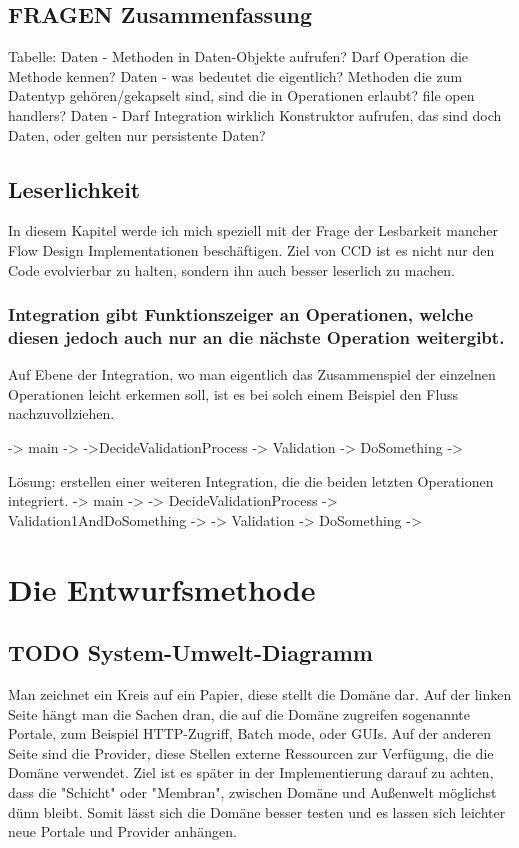 \documentclass[a4paper,12pt,oneside]{book}
\begin{document}
\section{FRAGEN Zusammenfassung}
\label{sec-4-8}

Tabelle:
Daten - Methoden in Daten-Objekte aufrufen? Darf Operation die Methode kennen?
Daten - was bedeutet die eigentlich? Methoden die zum Datentyp
gehören/gekapselt sind, sind die in Operationen erlaubt? file open handlers?
Daten - Darf Integration wirklich Konstruktor aufrufen, das sind doch Daten, oder gelten nur persistente Daten?



\section{Leserlichkeit}
\label{sec-4-9}
In diesem Kapitel werde ich mich speziell mit der Frage der Lesbarkeit mancher Flow Design Implementationen beschäftigen.
Ziel von CCD ist es nicht nur den Code evolvierbar zu halten, sondern ihn auch besser leserlich zu machen.

\subsection{Integration gibt Funktionszeiger an Operationen, welche diesen jedoch auch nur an die nächste Operation weitergibt.}
\label{sec-4-9-1}
Auf Ebene der Integration, wo man eigentlich das Zusammenspiel der einzelnen Operationen leicht erkennen soll, ist es bei solch einem Beispiel den
Fluss nachzuvollziehen.

-> main ->
->DecideValidationProcess -> Validation -> DoSomething ->

Lösung: erstellen einer weiteren Integration, die die beiden letzten Operationen integriert.
-> main ->
-> DecideValidationProcess -> Validation1AndDoSomething ->
                          -> Validation -> DoSomething ->


\chapter{Die Entwurfsmethode}
\label{sec-5}

\section{{\bfseries\sffamily TODO} System-Umwelt-Diagramm}
\label{sec-5-1}
    Man zeichnet ein Kreis auf ein Papier, diese stellt die Domäne dar.
    Auf der linken Seite hängt man die Sachen dran, die auf die Domäne zugreifen sogenannte Portale, zum Beispiel HTTP-Zugriff,
    Batch mode, oder GUIs.
    Auf der anderen Seite sind die Provider, diese Stellen externe Ressourcen zur Verfügung, die die Domäne verwendet.
    Ziel ist es später in der Implementierung darauf zu achten, dass die "Schicht" oder "Membran", zwischen Domäne und Außenwelt möglichst
dünn bleibt. Somit lässt sich die Domäne besser testen und es lassen sich leichter neue Portale und Provider anhängen.
\end{document}
